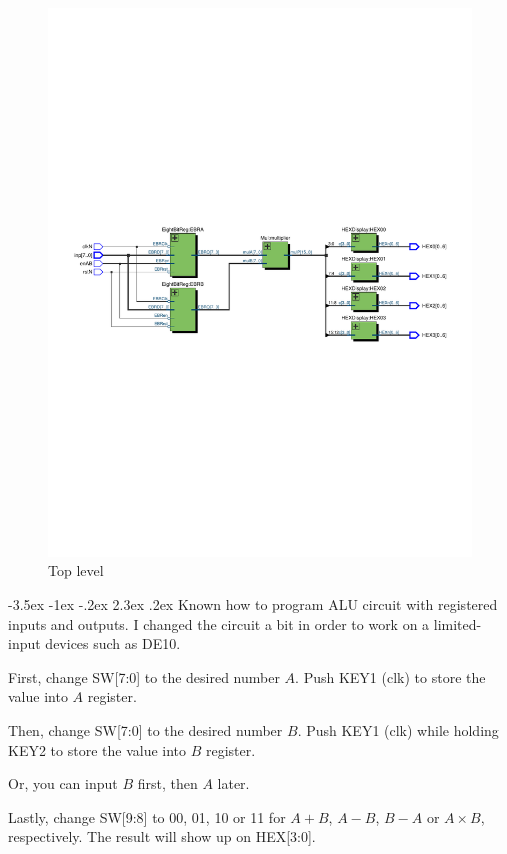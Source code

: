 \documentclass[13pt,a4paper]{report}
\makeatletter
\renewcommand\section{\@startsection {section}{1}{-1em}%
  {-3.5ex \@plus -1ex \@minus -.2ex}%
  {2.3ex \@plus.2ex}%
  {\normalfont\Large\bfseries}}
\makeatother
\begin{document}
\begin{figure}[H]
\centering
\includegraphics[scale=0.85, clip, trim={0cm 11cm 0cm 11cm}]{images/Exc3_RTL.pdf}
\caption*{Top level}
\end{figure}

\section{Known how to program ALU circuit with registered inputs and outputs.}
I changed the circuit a bit in order to work on a limited-input devices such as DE10.

First, change SW[7:0] to the desired number $A$. Push KEY1 (clk) to store the value into $A$ register.

Then, change SW[7:0] to the desired number $B$. Push KEY1 (clk) while holding KEY2 to store the value into $B$ register.

Or, you can input $B$ first, then $A$ later.

Lastly, change SW[9:8] to 00, 01, 10 or 11 for $A+B$, $A-B$, $B-A$ or $A\times B$, respectively. The result will show up on HEX[3:0].
\end{document}
